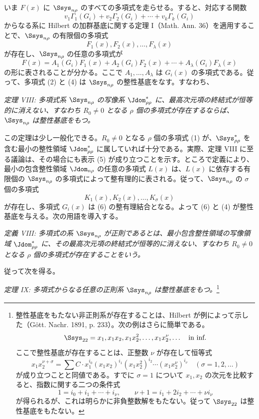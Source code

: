 \documentclass[11pt]{article}
\begin{document}
いま $F(x)$ に $\Ssys_{n\rho}$ のすべての多項式を走らせる。すると、対応する関数
\[
  v_1\Gamma_1(G_i)+v_2\Gamma_2(G_i)+\cdots+v_k\Gamma_k(G_i)
\]
からなる系に Hilbert の加群基底に関する定理 I（Math. Ann. 36）を適用することで、$\Ssys_{n\rho}$ の有限個の多項式
\begin{equation}
  F_1(x),F_2(x),\ldots,F_\lambda(x)
\tag{4}
\end{equation}
が存在し、$\Ssys_{n\rho}$ の任意の多項式が
\begin{equation}
  F(x)=A_1(G_i)F_1(x)+A_2(G_i)F_2(x)+\cdots+A_\lambda(G_i)F_\lambda(x)
\tag{5}
\end{equation}
の形に表されることが分かる。ここで $A_1,\ldots,A_\lambda$ は $G_i(x)$ の多項式である。従って、多項式 (2) と (4) は $\Ssys_{n\rho}$ の整性基底をなす。すなわち、

\emph{定理 VIII: 多項式系 $\Ssys_{n\rho}$ の写像系 $\Jdom^*_{\rho\rho}$ に、最高次元項の終結式が恒等的に消えない、すなわち $R_0\ne0$ となる $\rho$ 個の多項式が存在するならば、$\Ssys_{n\rho}$ は整性基底をもつ。}

この定理は少し一般化できる。$R_0\ne0$ となる $\rho$ 個の多項式 (1) が、$\Ssys^*_{\rho\rho}$ を含む最小の整性領域 $\Jdom^*_{\rho\rho}$ に属していれば十分である。実際、定理 VIII に至る議論は、その場合にも表示 (5) が成り立つことを示す。ところで定義により、最小の包含整性領域 $\Jdom_{n\rho}$ の任意の多項式 $L(x)$ は、$L(x)$ に依存する有限個の $\Ssys_{n\rho}$ の多項式によって整有理的に表される。従って、$\Ssys_{n\rho}$ の $\sigma$ 個の多項式
\begin{equation}
  K_1(x),K_2(x),\ldots,K_\sigma(x)
\tag{6}
\end{equation}
が存在し、多項式 $G_i(x)$ は (6) の整有理結合となる。よって (6) と (4) が整性基底を与える。次の用語を導入する。

\emph{定義 VIII: 多項式の系 $\Ssys_{n\rho}$ が正則であるとは、最小包含整性領域の写像領域 $\Jdom^*_{\rho\rho}$ に、その最高次元項の終結式が恒等的に消えない、すなわち $R_0\ne0$ となる $\rho$ 個の多項式が存在することをいう。}

従って次を得る。

\emph{定理 IX: 多項式からなる任意の正則系 $\Ssys_{n\rho}$ は整性基底をもつ。}\footnote{整性基底をもたない非正則系が存在することは、Hilbert が例によって示した（Gött. Nachr. 1891, p. 233）。次の例はさらに簡単である。
\[
  \Ssys_{22}=x_1,
  x_1x_2,
  x_1x_2^2,
  \ldots,
  x_1x_2^\nu,
  \ldots\quad\text{in inf.}
\]
ここで整性基底が存在することは、正整数 $\nu$ が存在して恒等式
\[
  x_1x_2^{\nu+\sigma}=\sum C\cdot x_1^{i_0}(x_1x_2)^{i_1}(x_1x_2^2)^{i_2}\cdots(x_1x_2^\nu)^{i_\nu}
  \quad(\sigma=1,2,\ldots)
\]
が成り立つことと同値である。すでに $\sigma=1$ について $x_1,x_2$ の次元を比較すると、指数に関する二つの条件式
\[
  1=i_0+i_1+\cdots+i_\nu,
  \qquad
  \nu+1=i_1+2i_2+\cdots+\nu i_\nu
\]
が得られるが、これは明らかに非負整数解をもたない。従って $\Ssys_{22}$ は整性基底をもたない。}
\end{document}
